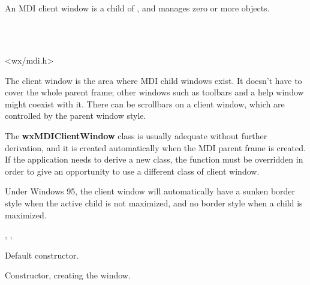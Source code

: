 \section{}\label{wxmdiclientwindow}

An MDI client window is a child of , and manages zero or
more  objects.


\\
\\


<wx/mdi.h>


The client window is the area where MDI child windows exist. It doesn't have to cover the whole
parent frame; other windows such as toolbars and a help window might coexist with it.
There can be scrollbars on a client window, which are controlled by the parent window style.

The {\bf wxMDIClientWindow} class is usually adequate without further derivation, and it is created
automatically when the MDI parent frame is created. If the application needs to derive a new class,
the function  must be
overridden in order to give an opportunity to use a different class of client window.

Under Windows 95, the client window will automatically have a sunken border style when
the active child is not maximized, and no border style when a child is maximized.


, ,\rtfsp
{}


\label{wxmdiclientwindowctor}


Default constructor.


Constructor, creating the window.

